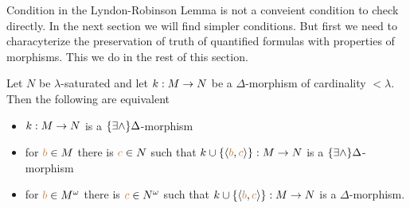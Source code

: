 Condition  in the Lyndon-Robinson Lemma is not a conveient condition to check directly. 
In the next section we will find simpler conditions. 
But first we need to characyterize the preservation of truth of quantified formulas with properties of morphisms.
This we do in the rest of this section.


% 

\begin{proposition}\label{prop_EDelta_estensione}
Let $N$ be $\lambda$-saturated and let $k:M\rightarrow N$ be a $\Delta$-morphism of cardinality $<\lambda$.
Then the following are equivalent
\begin{itemize}
\item[1.] $k:M\rightarrow N$ is a $\{\exists\wedge\}\Delta$-morphism
\item[2.] for ${\color{brown} b}\in M$ there is ${\color{brown} c}\in N$ such that $k\cup\{\langle{\color{brown}b},{\color{brown} c}\rangle\}:M\rightarrow N$ is a $\{\exists\wedge\}\Delta$-morphism
\item[3.] for ${\color{brown} b}\in M^\omega$ there is ${\color{brown} c}\in N^\omega$ such that $k\cup\{\langle{\color{brown}b},{\color{brown} c}\rangle\}:M\rightarrow N$ is a $\Delta$-morphism.
\end{itemize}
\end{proposition}

